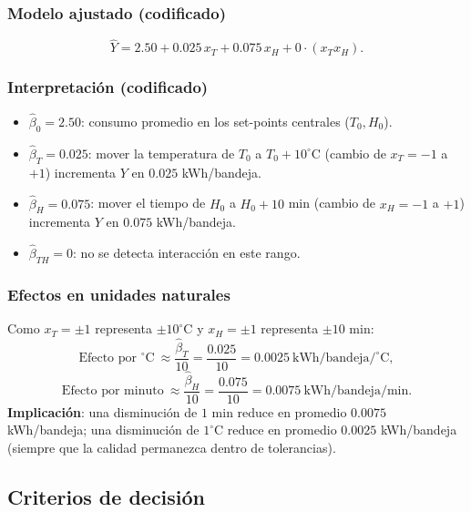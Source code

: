\subsubsection*{Modelo ajustado (codificado)}
\[
\hat{Y} = 2.50 + 0.025\,x_T + 0.075\,x_H + 0\cdot(x_Tx_H).
\]

\subsubsection*{Interpretación (codificado)}
\begin{itemize}
  \item $\hat{\beta}_0=2.50$: consumo promedio en los set-points centrales ($T_0, H_0$).
  \item $\hat{\beta}_T=0.025$: mover la temperatura de $T_0$ a $T_0{+}10^{\circ}\mathrm{C}$ (cambio de $x_T=-1$ a $+1$) incrementa $Y$ en $0.025$ kWh/bandeja.
  \item $\hat{\beta}_H=0.075$: mover el tiempo de $H_0$ a $H_0{+}10$ min (cambio de $x_H=-1$ a $+1$) incrementa $Y$ en $0.075$ kWh/bandeja.
  \item $\hat{\beta}_{TH}=0$: no se detecta interacción en este rango.
\end{itemize}

\subsubsection*{Efectos en unidades naturales}
Como $x_T=\pm 1$ representa $\pm 10^{\circ}\mathrm{C}$ y $x_H=\pm 1$ representa $\pm 10$ min:
\[
\text{Efecto por }^{\circ}\mathrm{C}\ \approx \frac{\hat{\beta}_T}{10} = \frac{0.025}{10} = 0.0025\ \text{kWh/bandeja/}^{\circ}\mathrm{C},
\]
\[
\text{Efecto por minuto}\ \approx \frac{\hat{\beta}_H}{10} = \frac{0.075}{10} = 0.0075\ \text{kWh/bandeja/min}.
\]
\textbf{Implicación}: una disminución de $1$ min reduce en promedio $0.0075$ kWh/bandeja; una disminución de $1^{\circ}\mathrm{C}$ reduce en promedio $0.0025$ kWh/bandeja (siempre que la calidad permanezca dentro de tolerancias).

\subsection{Criterios de decisión}

